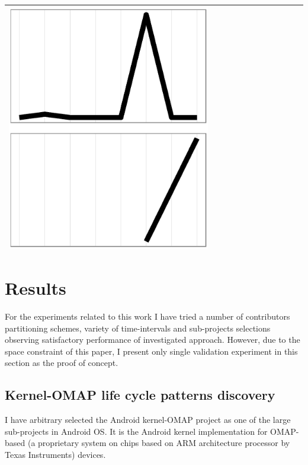 \documentclass[conference]{worldcomp}
\begin{document}
\begin{table}
\begin{tabular}{ | b{1.5cm} | c | c | c | c | c | c | c | c | c | c | c |}
 \includegraphics[scale=0.08]{figures/bbbc.ps} \\
  \hline
  \end{tabular}
\end{table}

\section{Results}
For the experiments related to this work I have tried a number of contributors 
partitioning schemes, variety of time-intervals and sub-projects selections observing
satisfactory performance of investigated approach. However, due to the space constraint 
of this paper, I present only single validation experiment in this section 
as the proof of concept.

\subsection{Kernel-OMAP life cycle patterns discovery}
I have arbitrary selected the Android kernel-OMAP project as one of the large sub-projects in Android OS. 
It is the Android kernel implementation for OMAP-based (a proprietary system on chips based on 
ARM architecture processor by Texas Instruments) devices.
\end{document}
